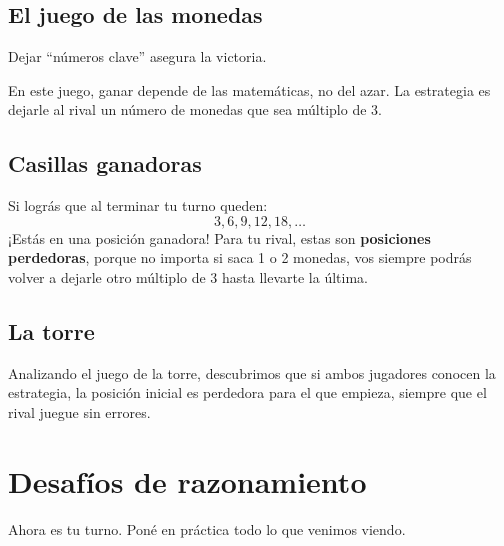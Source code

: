\documentclass[12pt]{article}
\begin{document}
    \subsection{El juego de las monedas}
    \begin{idea}
        Dejar ``números clave'' asegura la victoria.
    \end{idea}

    En este juego, ganar depende de las matemáticas, no del azar. La estrategia es dejarle al rival un número de monedas que sea múltiplo de 3.

    \subsection{Casillas ganadoras}
    Si lográs que al terminar tu turno queden:
    \[
    3, 6, 9, 12, 18, \dots
    \]
    ¡Estás en una posición ganadora! Para tu rival, estas son \textbf{posiciones perdedoras}, porque no importa si saca 1 o 2 monedas, vos siempre podrás volver a dejarle otro múltiplo de 3 hasta llevarte la última.

    \subsection{La torre}
    Analizando el juego de la torre, descubrimos que si ambos jugadores conocen la estrategia, la posición inicial es perdedora para el que empieza, siempre que el rival juegue sin errores.

    \newpage
    \section{Desafíos de razonamiento}
    Ahora es tu turno.
    Poné en práctica todo lo que venimos viendo.
\end{document}
